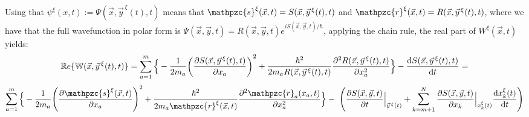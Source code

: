 \documentclass[11pt, a4paper]{article} %
\newcommand{\R}{\mathbb{R}} %
\newcommand{\z}{\mathpzc{s}}
\newcommand{\p}{\mathpzc{r}}
\newcommand{\W}{\mathbb{W}}
\begin{document}

Using that $\psi^\xi ( x, t) := \Psi(\vec{x}, \vec{y}^{\, \xi}(t),t)$ means that $\z^\xi(\vec{x},t)=S(\vec{x}, \vec{y}^{\, \xi}(t),t)$ and $\p^\xi (\vec{x},t)=R(\vec{x}, \vec{y}^{\, \xi}(t),t)$, where we have that the full wavefunction in polar form is $\Psi(\vec{x},\vec{y},t)=R(\vec{x},\vec{y},t)e^{iS(\vec{x},\vec{y},t)/\hbar}$, applying the chain rule, the real part of $W^\xi(\vec{x},t)$ yields:
\begin{equation}
\R e\{\W(\vec{x}, \vec{y}^{\, \xi}(t),t)\}=
\sum_{a=1}^m \Big\{-\frac{1}{2m_a} \qty(\pdv{S(\vec{x}, \vec{y}^{\, \xi}(t),t)}{x_a})^2 +\frac{\hbar^2}{2m_aR(\vec{x},\vec{y}^{\, \xi}(t),t)}\pdv[2]{R(\vec{x}, \vec{y}^{\, \xi}(t),t)}{x_a}\Big\}-\dv{S(\vec{x},\vec{y}^{\, \xi}(t),t)}{t}=
\end{equation}
$$
\sum_{a=1}^m\Big\{-\frac{1}{2m_a} \qty(\pdv{\z^\xi(\vec{x},t)}{x_a})^2 +\frac{\hbar^2}{2m_a\p^\xi(\vec{x},t)}\pdv[2]{\p_a(x_a, t)}{x_a}\Big\}- \ \qty(\pdv{S(\vec{x},\vec{y},t)}{t}\Big\rvert_{\vec{y}^{\, \xi}(t)}+\sum_{k=m+1}^N \pdv{S(\vec{x},\vec{y},t)}{x_k}\Big\rvert_{x_k^\xi(t)} \dv{x_k^\xi(t)}{t})
$$
\end{document}
